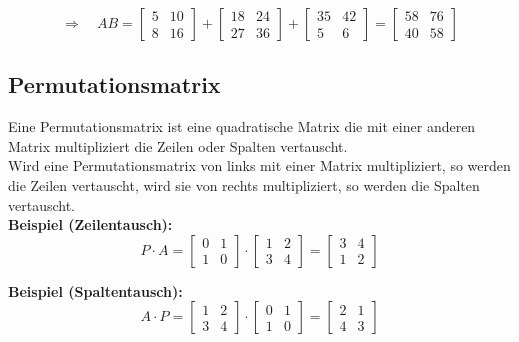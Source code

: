 \documentclass[12pt,a4paper]{article}
\begin{document}
\[
\Rightarrow
\quad
AB =
\begin{bmatrix}
    5 & 10 \\
    8 & 16
\end{bmatrix}
+
\begin{bmatrix}
    18 & 24 \\
    27 & 36
\end{bmatrix}
+
\begin{bmatrix}
    35 & 42 \\
    5 & 6
\end{bmatrix}
=
\begin{bmatrix}
    58 & 76 \\
    40 & 58
\end{bmatrix}
\]

\subsection{Permutationsmatrix}
Eine Permutationsmatrix ist eine quadratische Matrix die mit einer anderen Matrix multipliziert die Zeilen oder Spalten vertauscht. \\
Wird eine Permutationsmatrix von links mit einer Matrix multipliziert, so werden die Zeilen vertauscht, wird sie von rechts multipliziert, so werden die Spalten vertauscht. \\
\textbf{Beispiel (Zeilentausch):}
\[
P \cdot A
=
\begin{bmatrix}
0 & 1 \\
1 & 0
\end{bmatrix}
\cdot
\begin{bmatrix}
1 & 2 \\
3 & 4
\end{bmatrix}
=
\begin{bmatrix}
3 & 4 \\
1 & 2
\end{bmatrix}
\]

\textbf{Beispiel (Spaltentausch):}
\[
A \cdot P
=
\begin{bmatrix}
1 & 2 \\
3 & 4
\end{bmatrix}
\cdot
\begin{bmatrix}
0 & 1 \\
1 & 0
\end{bmatrix}
=
\begin{bmatrix}
2 & 1 \\
4 & 3
\end{bmatrix}
\]
\end{document}
